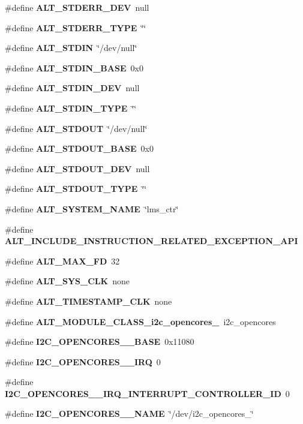 \begin{DoxyCompactItemize}
\item 
\#define {\bf A\+L\+T\+\_\+\+S\+T\+D\+E\+R\+R\+\_\+\+D\+EV}~null
\item 
\#define {\bf A\+L\+T\+\_\+\+S\+T\+D\+E\+R\+R\+\_\+\+T\+Y\+PE}~\char`\"{}\char`\"{}
\item 
\#define {\bf A\+L\+T\+\_\+\+S\+T\+D\+IN}~\char`\"{}/dev/null\char`\"{}
\item 
\#define {\bf A\+L\+T\+\_\+\+S\+T\+D\+I\+N\+\_\+\+B\+A\+SE}~0x0
\item 
\#define {\bf A\+L\+T\+\_\+\+S\+T\+D\+I\+N\+\_\+\+D\+EV}~null
\item 
\#define {\bf A\+L\+T\+\_\+\+S\+T\+D\+I\+N\+\_\+\+T\+Y\+PE}~\char`\"{}\char`\"{}
\item 
\#define {\bf A\+L\+T\+\_\+\+S\+T\+D\+O\+UT}~\char`\"{}/dev/null\char`\"{}
\item 
\#define {\bf A\+L\+T\+\_\+\+S\+T\+D\+O\+U\+T\+\_\+\+B\+A\+SE}~0x0
\item 
\#define {\bf A\+L\+T\+\_\+\+S\+T\+D\+O\+U\+T\+\_\+\+D\+EV}~null
\item 
\#define {\bf A\+L\+T\+\_\+\+S\+T\+D\+O\+U\+T\+\_\+\+T\+Y\+PE}~\char`\"{}\char`\"{}
\item 
\#define {\bf A\+L\+T\+\_\+\+S\+Y\+S\+T\+E\+M\+\_\+\+N\+A\+ME}~\char`\"{}lms\+\_\+ctr\char`\"{}
\item 
\#define {\bf A\+L\+T\+\_\+\+I\+N\+C\+L\+U\+D\+E\+\_\+\+I\+N\+S\+T\+R\+U\+C\+T\+I\+O\+N\+\_\+\+R\+E\+L\+A\+T\+E\+D\+\_\+\+E\+X\+C\+E\+P\+T\+I\+O\+N\+\_\+\+A\+PI}
\item 
\#define {\bf A\+L\+T\+\_\+\+M\+A\+X\+\_\+\+FD}~32
\item 
\#define {\bf A\+L\+T\+\_\+\+S\+Y\+S\+\_\+\+C\+LK}~none
\item 
\#define {\bf A\+L\+T\+\_\+\+T\+I\+M\+E\+S\+T\+A\+M\+P\+\_\+\+C\+LK}~none
\item 
\#define {\bf A\+L\+T\+\_\+\+M\+O\+D\+U\+L\+E\+\_\+\+C\+L\+A\+S\+S\+\_\+i2c\+\_\+opencores\+\_}~i2c\+\_\+opencores
\item 
\#define {\bf I2\+C\+\_\+\+O\+P\+E\+N\+C\+O\+R\+E\+S\+\_\+\_\+\+B\+A\+SE}~0x11080
\item 
\#define {\bf I2\+C\+\_\+\+O\+P\+E\+N\+C\+O\+R\+E\+S\+\_\+\_\+\+I\+RQ}~0
\item 
\#define {\bf I2\+C\+\_\+\+O\+P\+E\+N\+C\+O\+R\+E\+S\+\_\+\_\+\+I\+R\+Q\+\_\+\+I\+N\+T\+E\+R\+R\+U\+P\+T\+\_\+\+C\+O\+N\+T\+R\+O\+L\+L\+E\+R\+\_\+\+ID}~0
\item 
\#define {\bf I2\+C\+\_\+\+O\+P\+E\+N\+C\+O\+R\+E\+S\+\_\+\_\+\+N\+A\+ME}~\char`\"{}/dev/i2c\+\_\+opencores\+\_\char`\"{}

\end{DoxyCompactItemize}

